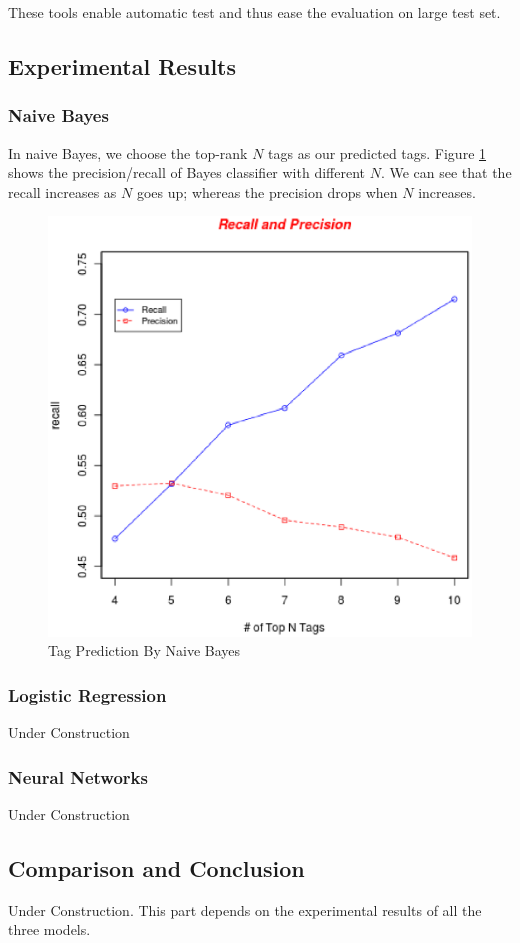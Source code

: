 These tools enable automatic test and thus ease the evaluation on large test set.

\subsection{Experimental Results}
\subsubsection{Naive Bayes}
In naive Bayes, we choose the top-rank $N$ tags as our predicted tags. Figure \ref{fig:naive} shows the precision/recall of Bayes classifier with different $N$. We can see that the recall increases as $N$ goes up; whereas the precision drops when $N$ increases.

\begin{figure}[htb!]
\centering%
    \includegraphics[scale=0.42]{naives.eps}
\caption{Tag Prediction By Naive Bayes}
\label{fig:naive}
\end{figure}

\subsubsection{Logistic Regression}
Under Construction

\subsubsection{Neural Networks}
Under Construction

\subsection{Comparison and Conclusion}
Under Construction. This part depends on the experimental results of all the three models.

